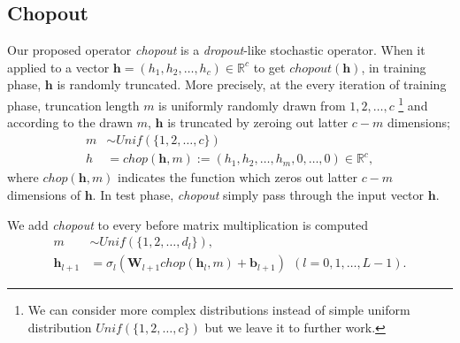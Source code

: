 \documentclass{article}
\begin{document}
    \subsection{Chopout}
    Our proposed operator \textit{chopout} is a \textit{dropout}-like stochastic operator. 
    When it applied to a vector $\mathbf{h} = (h_1, h_2, \dots, h_c) \in \mathbb{R}^c$ to get $chopout(\mathbf{h})$, in training phase, $\mathbf{h}$ is randomly truncated. 
    More precisely, at the every iteration of training phase, truncation length $m$ is uniformly randomly drawn from ${1, 2, \dots, c}$ \footnote{We can consider more complex distributions instead of simple uniform distribution $Unif(\{1,2, \dots, c\})$ but we leave it to further work.} and according to the drawn $m$, $\mathbf{h}$ is truncated by zeroing out latter $c-m$ dimensions;    
    \begin{align}
        m &\sim Unif(\{1, 2, \dots, c\}) \nonumber \\
        h &= chop(\mathbf{h}, m) := (h_1, h_2, \dots, h_m, 0, \dots, 0) \in \mathbb{R}^c,
    \end{align}    
    where $chop(\mathbf{h}, m)$ indicates the function which zeros out latter $c-m$ dimensions of $\mathbf{h}$.
    In test phase, \textit{chopout} simply pass through the input vector $\mathbf{h}$.

    We add \textit{chopout} to every before matrix multiplication is computed
    \begin{align}
      m &\sim Unif(\{1, 2, \dots, d_l\}), \nonumber \\
      \mathbf{h}_{l+1} &= {\sigma}_l (\mathbf{W}_{l+1} chop(\mathbf{h}_l, m) + \mathbf{b}_{l+1}) \ \ (l=0, 1, \dots, L-1). \label{eq:nn_with_chopout}
    \end{align}
    
\end{document}
